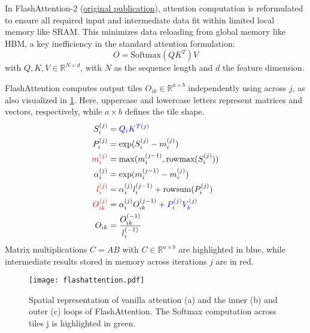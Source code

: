 \documentclass{article}
\begin{document}


\noindent In FlashAttention-2 (\href{https://arxiv.org/abs/2307.08691}{original publication}), attention computation is reformulated to ensure all required input and intermediate data fit within limited local memory like SRAM.
This minimizes data reloading from global memory like HBM, a key inefficiency in the standard attention formulation:
$$ O = \mathrm{Softmax}(Q K^T)V $$
with $Q, K, V \in \mathbb{R}^{N \times d}$, with $N$ as the sequence length and $d$ the feature dimension.

FlashAttention computes output tiles $O_{ik} \in \mathbb{R}^{a \times b}$ independently using  across $j$, as also visualized in \cref{fig:flashattention}.
Here, uppercase and lowercase letters represent matrices and vectors, respectively, while $a \times b$ defines the tile shape.
\begin{align}
  S_i^{(j)} &= \textcolor{blue}{Q_i K^{T(j)}} \label{eq:s} \\
  P_i^{(j)} &= \exp(S_i^{(j)} - m_i^{(j)}) \label{eq:p} \\
  \textcolor{red}{m_i^{(j)}} &= \max(m_i^{(j-1)}, \text{rowmax} (S_i^{(j)})) \label{eq:m} \\
  \alpha_i^{(j)} &= \exp(m_i^{(j-1)} - m_i^{(j)}) \label{eq:alpha} \\
  \textcolor{red}{l_i^{(j)}} &= \alpha_i^{(j)} l_i^{(j-1)} + \text{rowsum}(P_i^{(j)}) \label{eq:l} \\
  \textcolor{red}{O_{ik}^{(j)}} &= \alpha_i^{(j)} O_{ik}^{(j-1)} + \textcolor{blue}{P_i^{(j)} V_k^{(j)}} \label{eq:oikj} \\
  O_{ik} &= \frac{O_{ik}^{(-1)}}{l_i^{(-1)}} \label{eq:oik}
\end{align}
Matrix multiplications $C=AB$ with $C \in \mathbb{R}^{a \times b}$ are highlighted in blue, while intermediate results stored in memory across iterations $j$ are in red.

\begin{figure}
  \centering
  \texttt{[image: flashattention.pdf]}
  \caption{
    Spatial representation of vanilla attention (a) and the inner (b) and outer (c) loops of FlashAttention.
    The Softmax computation across tiles j is highlighted in green.
  }
  \label{fig:flashattention}
\end{figure}
\end{document}
